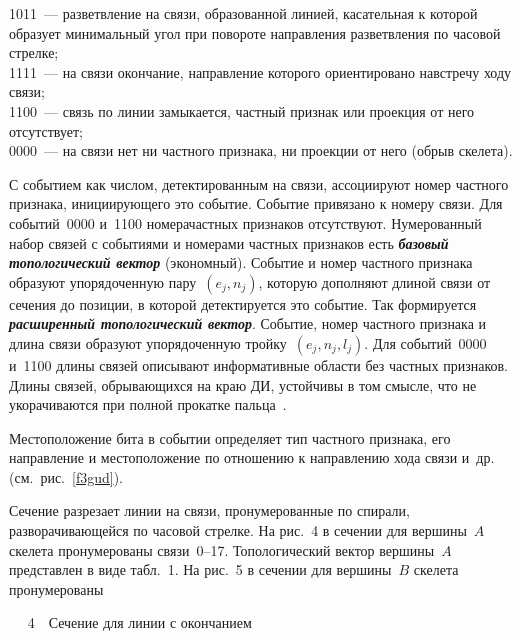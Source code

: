 \begin{multicols}{2}
1011~--- разветвление на связи, образованной линией, касательная к которой образует
минимальный угол при повороте направления разветвления по часовой стрелке;\\[-9pt]

1111~--- на связи окончание, направление которого ориентировано навстречу ходу связи;\\[-9pt]

1100~--- связь по линии замыкается, частный признак или проекция от него отсутствует;\\[-9pt]

0000~--- на связи нет ни частного признака, ни проекции от него (обрыв скелета).

\smallskip


С событием как числом, детектированным на связи, ассоциируют номер частного признака,
инициирующего это событие. Событие привязано к номеру связи. Для событий~0000 и~1100
номера\linebreak частных признаков отсутствуют. Нумерованный набор связей с событиями и номерами
част\-ных приз\-на\-ков есть {\bfseries\textit{базовый топологический вектор}} (экономный).
Событие и номер частного признака образуют упорядоченную пару~$(e_j,n_j)$, которую
дополняют длиной связи от сечения до позиции, в которой детектируется это событие. Так
формируется {\bfseries\textit{расширенный топологический вектор}}. Событие, номер частного
признака и длина связи образуют упорядоченную тройку~$(e_j,n_j,l_j)$. Для событий~0000
и~1100 длины связей описывают информативные области без частных признаков. Длины связей,
обрывающихся на краю ДИ, устойчивы в том смысле, что не укорачиваются при полной
прокатке пальца~\cite{3gud}.

Местоположение бита в событии определяет тип частного признака, его направление и
местоположение по отношению к направлению хода связи и~др. (см.\ рис.~\ref{f3gud}).


Сечение разрезает линии на связи, пронумерованные по спирали, разворачивающейся по часовой
стрелке. На рис.~4 в сечении для вершины~$A$ скелета
 пронумерованы связи~0--17.
Топологический вектор вершины~$A$ представлен в виде табл.~1. На рис.~5
 в сечении для вершины~$B$ скелета пронумерованы\linebreak\vspace*{-12pt}
\begin{center} %
\vspace*{9pt}
\mbox{%
\epsfxsize=72.915mm
}
\vspace*{12pt}
{{\figurename~4}\ \ \small{Сечение для линии с окончанием}}
\end{center}
\pagebreak



\end{multicols}
